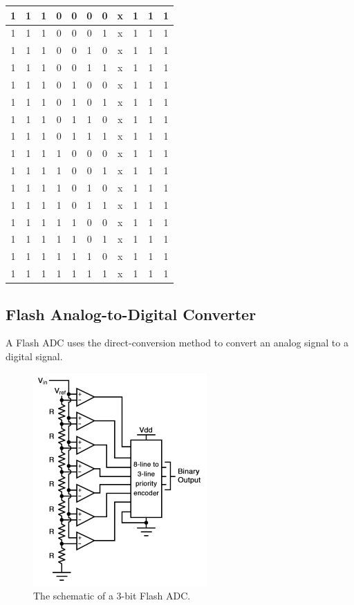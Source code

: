 \documentclass[conference]{IEEEtran}
\begin{document}
\begin{table}[htbp]
\begin{center}
\begin{tabular}{|c|c|c|c|c|c|c|c|c|c|c|}
\hline
1 & 1 & 1 & 0 & 0 & 0 & 0 & x & 1 & 1 & 1 \\
\hline
1 & 1 & 1 & 0 & 0 & 0 & 1 & x & 1 & 1 & 1 \\
\hline
1 & 1 & 1 & 0 & 0 & 1 & 0 & x & 1 & 1 & 1 \\
\hline
1 & 1 & 1 & 0 & 0 & 1 & 1 & x & 1 & 1 & 1 \\
\hline
1 & 1 & 1 & 0 & 1 & 0 & 0 & x & 1 & 1 & 1 \\
\hline
1 & 1 & 1 & 0 & 1 & 0 & 1 & x & 1 & 1 & 1 \\
\hline
1 & 1 & 1 & 0 & 1 & 1 & 0 & x & 1 & 1 & 1 \\
\hline
1 & 1 & 1 & 0 & 1 & 1 & 1 & x & 1 & 1 & 1 \\
\hline
1 & 1 & 1 & 1 & 0 & 0 & 0 & x & 1 & 1 & 1 \\
\hline
1 & 1 & 1 & 1 & 0 & 0 & 1 & x & 1 & 1 & 1 \\
\hline
1 & 1 & 1 & 1 & 0 & 1 & 0 & x & 1 & 1 & 1 \\
\hline
1 & 1 & 1 & 1 & 0 & 1 & 1 & x & 1 & 1 & 1 \\
\hline
1 & 1 & 1 & 1 & 1 & 0 & 0 & x & 1 & 1 & 1 \\
\hline
1 & 1 & 1 & 1 & 1 & 0 & 1 & x & 1 & 1 & 1 \\
\hline
1 & 1 & 1 & 1 & 1 & 1 & 0 & x & 1 & 1 & 1 \\
\hline
1 & 1 & 1 & 1 & 1 & 1 & 1 & x & 1 & 1 & 1 \\
\hline
\end{tabular}
\end{center}
\end{table}

\subsection{Flash Analog-to-Digital Converter}

A Flash ADC uses the direct-conversion method to convert an analog signal to a digital signal.

\begin{figure}[htbp]
\centerline{\includegraphics{ADCsch.png}}
\caption{The schematic of a 3-bit Flash ADC.}
\end{figure}
\end{document}
